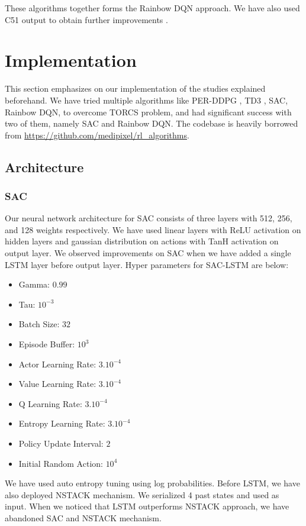 \documentclass[conference]{IEEEtran}
\begin{document}
These algorithms together forms the Rainbow DQN approach. We have also used C51 output to obtain further improvements \cite{bellemare2017distributional}.

\section{Implementation}

This section emphasizes on our implementation of the studies explained beforehand. We have tried multiple algorithms like PER-DDPG \cite{hou2017novel}, TD3 \cite{fujimoto2018addressing}, SAC, Rainbow DQN, to overcome TORCS problem, and had significant success with two of them, namely SAC and Rainbow DQN. The codebase is heavily borrowed from \url{https://github.com/medipixel/rl_algorithms}.

\subsection{Architecture}

\subsubsection{SAC}
Our neural network architecture for SAC consists of three layers with 512, 256, and 128 weights respectively. We have used linear layers with ReLU activation on hidden layers and gaussian distribution on actions with TanH activation on output layer. We observed improvements on SAC when we have added a single LSTM layer before output layer. Hyper parameters for SAC-LSTM are below:

\begin{itemize}
    \item Gamma: $0.99$
    \item Tau: $10^{-3}$
    \item Batch Size: $32$
    \item Episode Buffer: $10^3$
    \item Actor Learning Rate: $3.10^{-4}$
    \item Value Learning Rate: $3.10^{-4}$
    \item Q Learning Rate: $3.10^{-4}$
    \item Entropy Learning Rate: $3.10^{-4}$
    \item Policy Update Interval: $2$
    \item Initial Random Action: $10^4$
\end{itemize}

We have used auto entropy tuning using log probabilities. Before LSTM, we have also deployed NSTACK mechanism. We serialized 4 past states and used as input. When we noticed that LSTM outperforms NSTACK approach, we have abandoned SAC and NSTACK mechanism.
\end{document}
